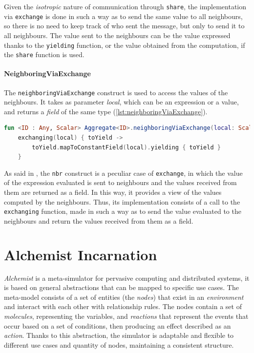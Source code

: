 Given the \emph{isotropic} nature of communication through \texttt{share}, the implementation via \texttt{exchange} is done
in such a way as to send the same value to all neighbours, so there is no need to keep track of who sent the message,
but only to send it to all neighbours.
The value sent to the neighbours can be the value expressed thanks to the \texttt{yielding} function, or the value obtained
from the computation, if the \texttt{share} function is used.

\paragraph{NeighboringViaExchange}
The \texttt{neighboringViaExchange} construct is used to access the values of the neighbours.
It takes as parameter \emph{local}, which can be an expression or a value, and returns a \emph{field} of the same type (\ref{lst:neighboringViaExchange}).

\begin{lstlisting}[language=kt,label={lst:neighboringViaExchange},caption={The implementation of the \texttt{neighboringViaExchange} function.}]
fun <ID : Any, Scalar> Aggregate<ID>.neighboringViaExchange(local: Scalar): Field<ID, Scalar> =
    exchanging(local) { toYield ->
        toYield.mapToConstantField(local).yielding { toYield }
    }
\end{lstlisting}

As said in , the \texttt{nbr} construct is a peculiar case of \texttt{exchange}, in which
the value of the expression evaluated is sent to neighbours and the values received from them are returned as a field.
In this way, it provides a view of the values computed by the neighbours.
Thus, its implementation consists of a call to the \texttt{exchanging} function, made in such a way as to send the value
evaluated to the neighbours and return the values received from them as a field.

\section{Alchemist Incarnation}
\label{sec:incarnation}
\emph{Alchemist} is a meta-simulator for pervasive computing and distributed systems, it is based on general abstractions
that can be mapped to specific use cases.
The meta-model consists of a set of entities (the \emph{nodes}) that exist in an \emph{environment} and interact with each other
with relationship rules.
The nodes contain a set of \emph{molecules}, representing the variables, and \emph{reactions} that represent the events
that occur based on a set of conditions, then producing an effect described as an \emph{action}.
Thanks to this abstraction, the simulator is adaptable and flexible to different use cases and quantity of nodes,
maintaining a consistent structure.

